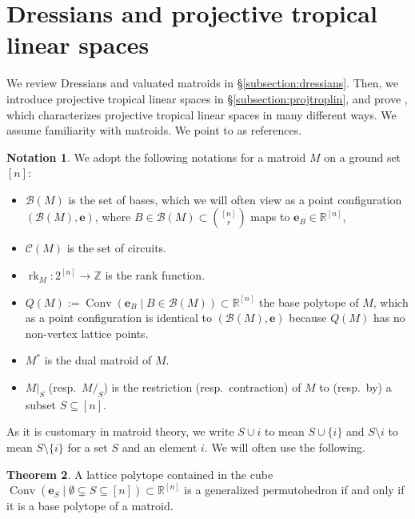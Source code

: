 \documentclass[11pt]{amsart}
\newcommand{\RR}{\mathbb R}
\newcommand{\ZZ}{\mathbb Z}
\newcommand{\bb}{\mathcal B}
\newcommand{\cc}{\mathcal C}
\newcommand{\be}{\mathbf e}
\theoremstyle{definition}
\newtheorem{thm}{Theorem}[subsection]
\newtheorem{notation}[thm]{Notation}
\begin{document}

\section{Dressians and projective tropical linear spaces}
\label{section:projtroplin}

We review Dressians and valuated matroids in \S\ref{subsection:dressians}.  Then, we introduce projective tropical linear spaces in \S\ref{subsection:projtroplin}, and prove , which characterizes projective tropical linear spaces in many different ways.  We assume familiarity with matroids.  We point to \cite{Wel76, Oxl11} as references.

\begin{notation}
We adopt the following notations for a matroid $M$ on a ground set $[n]$:
\begin{itemize}
\item $\bb(M)$ is the set of bases, which we will often view as a point configuration $(\bb(M), \be)$, where $B\in \bb(M) \subset {\binom{[n]}{r}}$ maps to $\be_B\in \RR^{[n]}$,
\item $\cc(M)$ is the set of circuits.
\item $\operatorname{rk}_M: 2^{[n]} \to \ZZ$ is the rank function.
\item $Q(M) := \operatorname{Conv}(\be_B \mid B\in \bb(M)) \subset \RR^{[n]}$ the base polytope of $M$, which as a point configuration is identical to $(\mathcal B(M), \be)$ because $Q(M)$ has no non-vertex lattice points.
\item $M^*$ is the dual matroid of $M$.
\item $M|_S$ (resp.\ $M/_S$) is the restriction (resp.\ contraction) of $M$ to (resp.\ by) a subset $S\subseteq [n]$.
\end{itemize}
\end{notation}

As it is customary in matroid theory, we write $S\cup i$ to mean $S\cup \{i\}$ and $S\setminus i$ to mean $S\setminus \{i\}$ for a set $S$ and an element $i$.  We will often use the following.

\begin{thm}\cite{GGMS87}\label{thm:GGMS} A lattice polytope contained in the cube $\operatorname{Conv}(\be_S \mid \emptyset \subsetneq S \subseteq [n]) \subset \RR^{[n]}$ is a generalized permutohedron if and only if it is a base polytope of a matroid.
\end{thm}
\end{document}

